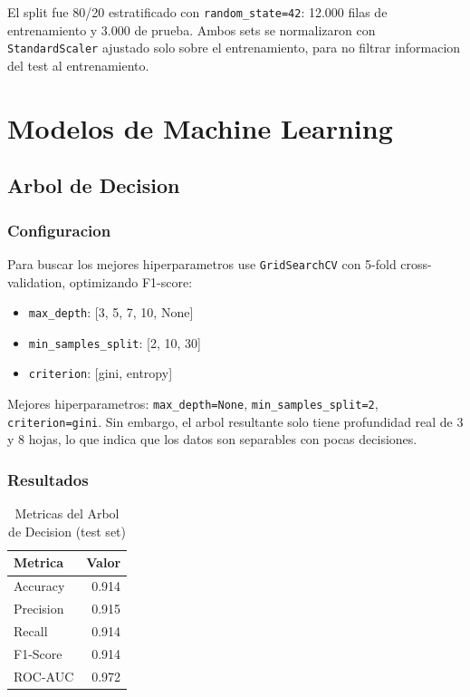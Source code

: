 \documentclass[12pt, a4paper]{article}
\begin{document}
El split fue 80/20 estratificado con \texttt{random\_state=42}: 12.000 filas de entrenamiento y 3.000 de prueba. Ambos sets se normalizaron con \texttt{StandardScaler} ajustado solo sobre el entrenamiento, para no filtrar informacion del test al entrenamiento.

\section{Modelos de Machine Learning}

\subsection{Arbol de Decision}

\subsubsection{Configuracion}

Para buscar los mejores hiperparametros use \texttt{GridSearchCV} con 5-fold cross-validation, optimizando F1-score:
\begin{itemize}
\item \texttt{max\_depth}: [3, 5, 7, 10, None]
\item \texttt{min\_samples\_split}: [2, 10, 30]
\item \texttt{criterion}: [gini, entropy]
\end{itemize}

Mejores hiperparametros: \texttt{max\_depth=None}, \texttt{min\_samples\_split=2}, \texttt{criterion=gini}. Sin embargo, el arbol resultante solo tiene profundidad real de 3 y 8 hojas, lo que indica que los datos son separables con pocas decisiones.

\subsubsection{Resultados}

\begin{table}[H]
\centering
\caption{Metricas del Arbol de Decision (test set)}
\begin{tabular}{lr}
\toprule
\textbf{Metrica} & \textbf{Valor} \\
\midrule
Accuracy    & 0.914 \\
Precision   & 0.915 \\
Recall      & 0.914 \\
F1-Score    & 0.914 \\
ROC-AUC     & 0.972 \\
\bottomrule
\end{tabular}
\end{table}
\end{document}
